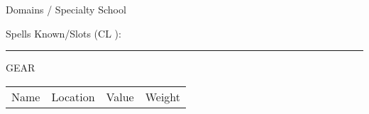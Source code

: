 \documentclass[article,10pt]{letter}
\newcommand{\hr}{\vspace{-1.5ex}\rule{\linewidth}{0.4pt}}
\newcommand{\afterenum}{\everypar{\parindent=0pt\hangindent=1em}}
\newcounter{totalweight}
\newcounter{totalworth}
\begin{document}
{Domains / Specialty School}\\
\domains

{Spells Known/Slots} (CL ):\\
\spellsknown
\afterenum

\hr

\large {GEAR}\\
\begin{tabular}{l c c c}
 Name & Location & Value & Weight \\
 
\end{tabular}\\
\endgroup

\notes

\scenariolist
\end{document}
